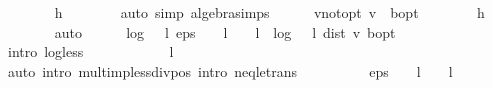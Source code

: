 \begin{isabellebody}
\ \ \ \ \ \ \isamarkupfalse%
\ h\isanewline
\ \ \ \ \ \ \isamarkupfalse%
\ {\isacharparenleft}{\kern0pt}auto\ simp{\isacharcolon}{\kern0pt}\ algebra{\isacharunderscore}{\kern0pt}simps{\isacharparenright}{\kern0pt}\isanewline
\ \ \ \ \isamarkupfalse%
\ v{\isacharunderscore}{\kern0pt}not{\isacharunderscore}{\kern0pt}opt{\isacharcolon}{\kern0pt}\ {\isachardoublequoteopen}v\ {\isasymnoteq}\ {\isasymnu}\isactrlsub b{\isacharunderscore}{\kern0pt}opt{\isachardoublequoteclose}\isanewline
\ \ \ \ \ \ \isamarkupfalse%
\ h\isanewline
\ \ \ \ \ \ \isamarkupfalse%
\ auto\isanewline
\ \ \ \ \isamarkupfalse%
\ {\isachardoublequoteopen}log\ {\isacharparenleft}{\kern0pt}{}\ {\isacharslash}{\kern0pt}\ l{\isacharparenright}{\kern0pt}\ {\isacharparenleft}{\kern0pt}eps\ {\isacharasterisk}{\kern0pt}\ {\isacharparenleft}{\kern0pt}{}\ {\isacharminus}{\kern0pt}\ l{\isacharparenright}{\kern0pt}\ {\isacharslash}{\kern0pt}\ {\isacharparenleft}{\kern0pt}{}\ {\isacharasterisk}{\kern0pt}\ l{\isacharparenright}{\kern0pt}{\isacharparenright}{\kern0pt}\ {\isacharless}{\kern0pt}\ log\ {\isacharparenleft}{\kern0pt}{}\ {\isacharslash}{\kern0pt}\ l{\isacharparenright}{\kern0pt}\ {\isacharparenleft}{\kern0pt}dist\ v\ {\isasymnu}\isactrlsub b{\isacharunderscore}{\kern0pt}opt{\isacharparenright}{\kern0pt}{\isachardoublequoteclose}\isanewline
\ \ \ \ \isamarkupfalse%
\ {\isacharparenleft}{\kern0pt}intro\ log{\isacharunderscore}{\kern0pt}less{\isacharparenright}{\kern0pt}\isanewline
\ \ \ \ \ \ \isamarkupfalse%
\ {\isachardoublequoteopen}{}\ {\isacharless}{\kern0pt}\ {}\ {\isacharslash}{\kern0pt}\ l{\isachardoublequoteclose}\isanewline
\ \ \ \ \ \ \ \ \isamarkupfalse%
\ {\isacharparenleft}{\kern0pt}auto\ intro{\isacharbang}{\kern0pt}{\isacharcolon}{\kern0pt}\ mult{\isacharunderscore}{\kern0pt}imp{\isacharunderscore}{\kern0pt}less{\isacharunderscore}{\kern0pt}div{\isacharunderscore}{\kern0pt}pos\ intro{\isacharcolon}{\kern0pt}\ neq{\isacharunderscore}{\kern0pt}le{\isacharunderscore}{\kern0pt}trans{\isacharparenright}{\kern0pt}\isanewline
\ \ \ \ \ \ \isamarkupfalse%
\ {\isachardoublequoteopen}{}\ {\isacharless}{\kern0pt}\ eps\ {\isacharasterisk}{\kern0pt}\ {\isacharparenleft}{\kern0pt}{}\ {\isacharminus}{\kern0pt}\ l{\isacharparenright}{\kern0pt}\ {\isacharslash}{\kern0pt}\ {\isacharparenleft}{\kern0pt}{}\ {\isacharasterisk}{\kern0pt}\ l{\isacharparenright}{\kern0pt}{\isachardoublequoteclose}\ \isanewline

\end{isabellebody}
